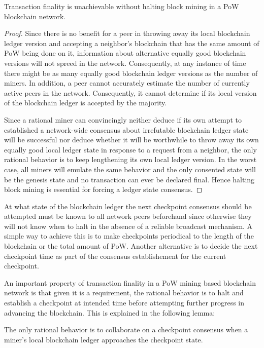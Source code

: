 \begin{lemma}
\label{l-halt}
Transaction finality is unachievable without halting block mining in a PoW blockchain network.  
\end{lemma}

\begin{proof}
Since there is no benefit for a peer in throwing away its local blockchain ledger version and accepting a neighbor's blockchain that has the same amount of PoW being done on it, information about alternative equally good blockchain versions will not spreed in the network. Consequently, at any instance of time there might be as many equally good blockchain ledger versions as the number of miners. In addition, a peer cannot accurately estimate the number of currently active peers in the network. Consequently, it cannot determine if its local version of the blockchain ledger is accepted by the majority. 

Since a rational miner can convincingly neither deduce if its own attempt to established a network-wide consensus about irrefutable blockchain ledger state will be successful nor deduce whether it will be worthwhile to throw away its own equally good local ledger state in response to a request from a neighbor, the only rational behavior is to keep lengthening its own local ledger version. In the worst case, all miners will emulate the same behavior and the only consented state will be the genesis state and no transaction can ever be declared final. Hence halting block mining is essential for forcing a ledger state consensus.             
\end{proof}                

At what state of the blockchain ledger the next checkpoint consensus should be attempted must be known to all network peers beforehand since otherwise they will not know when to halt in the absence of a reliable broadcast mechanism. A simple way to achieve this is to make checkpoints periodical to the length of the blockchain or the total amount of PoW. Another alternative is to decide the next checkpoint time as part of the consensus establishement for the current checkpoint.    

An important property of transaction finality in a PoW mining based blockchain network is that given it is a requirement, the rational behavior is to halt and establish a checkpoint at intended time before attempting further progress in advancing the blockchain. This is explained in the following lemma:

\begin{lemma}
\label{l-rationality}
The only rational behavior is to collaborate on a checkpoint consensus when a miner's local blockchain ledger approaches the checkpoint state.       
\end{lemma}

